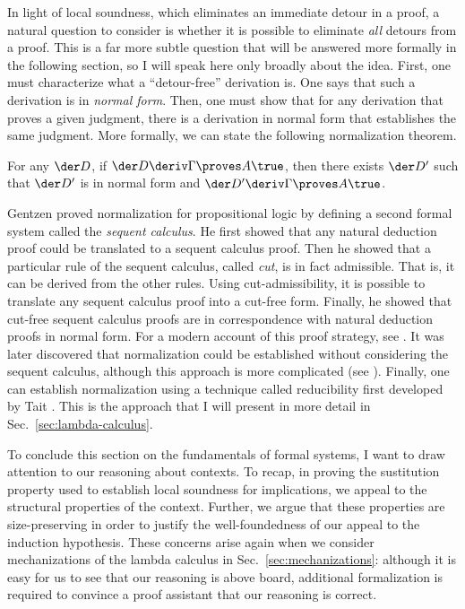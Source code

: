 In light of local soundness, which eliminates an immediate detour in a proof, a
natural question to consider is whether it is possible to eliminate \emph{all}
detours from a proof.
This is a far more subtle question that will be answered more formally in the
following section, so I will speak here only broadly about the idea.
First, one must characterize what a ``detour-free'' derivation is.
One says that such a derivation is in \emph{normal form}.
Then, one must show that for any derivation that proves a given judgment,
there is a derivation in normal form that establishes the same judgment.
More formally, we can state the following normalization theorem.
\begin{thm}
  For any $\der D$, if $\der D \deriv \Gamma \proves A \true$, then there exists
  $\der D^\prime$ such that $\der D^\prime$ is in normal form and
  $\der D^\prime \deriv \Gamma \proves A \true$.
\end{thm}
%
%
%
Gentzen proved normalization for propositional logic by defining a second formal
system called the \emph{sequent calculus}.
He first showed that any natural deduction proof could be translated to a
sequent calculus proof.
Then he showed that a particular rule of the sequent calculus, called
\emph{cut}, is in fact admissible. That is, it can be derived from the other
rules.
Using cut-admissibility, it is possible to translate any sequent calculus proof
into a cut-free form.
Finally, he showed that cut-free sequent calculus proofs are in correspondence
with natural deduction proofs in normal form.
For a modern account of this proof strategy, see \cite{pfenning-cut}.
It was later discovered that normalization could be established without
considering the sequent calculus, although this approach is more complicated
(see \cite{prawitz-normalization}).
Finally, one can establish normalization using a technique called reducibility
first developed by Tait \cite{tait-reducibility}. This is the approach that I
will present in more detail in Sec.~\ref{sec:lambda-calculus}.

To conclude this section on the fundamentals of formal systems, I want to draw
attention to our reasoning about contexts.
To recap, in proving the sustitution property used to establish local soundness
for implications, we appeal to the structural properties of the context.
Further, we argue that these properties are size-preserving in order to justify
the well-foundedness of our appeal to the induction hypothesis.
These concerns arise again when we consider mechanizations of the lambda
calculus in Sec.~\ref{sec:mechanizations}: although it is easy for us to see
that our reasoning is above board, additional formalization is required to
convince a proof assistant that our reasoning is correct.

